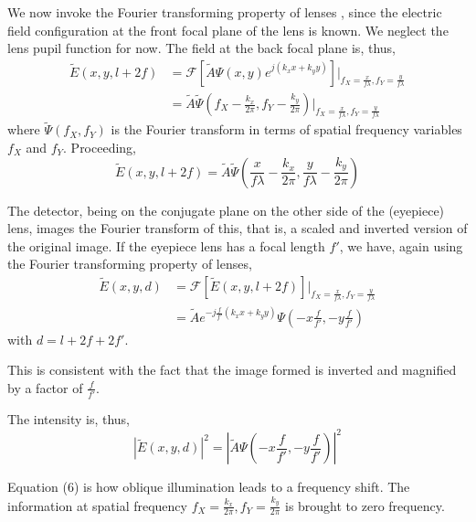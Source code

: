 \documentclass[11pt,a4paper,journal]{IEEEtran}
\begin{document}
We now invoke the Fourier transforming property of lenses \cite[p.~104]{Goodman}, since the electric field configuration at the front focal plane of the lens is known. We neglect the lens pupil function for now. The field at the back focal plane is, thus, 
\begin{equation}
\begin{split}
\tilde{E}(x, y, l+2f) &= \mathcal{F}[\tilde{A} \Psi (x, y) e^{j(k_x x + k_y y)}] \bigg|_{f_X=\frac{x}{f\lambda}, f_Y=\frac{y}{f\lambda}} \\
					  &= \tilde{A} \tilde{\Psi}\left(f_X - \frac{k_x}{2\pi}, f_Y - \frac{k_y}{2\pi}\right) \bigg|_{f_X=\frac{x}{f\lambda}, f_Y=\frac{y}{f\lambda}}
\end{split}
\end{equation}
where $\tilde{\Psi}(f_X, f_Y)$ is the Fourier transform in terms of spatial frequency variables $f_X$ and $f_Y$. Proceeding, 
\begin{equation}
\tilde{E}(x, y, l+2f) = \tilde{A} \tilde{\Psi}\left(\frac{x}{f\lambda} - \frac{k_x}{2\pi}, \frac{y}{f\lambda} - \frac{k_y}{2\pi}\right)
\end{equation}

The detector, being on the conjugate plane on the other side of the (eyepiece) lens, images the Fourier transform of this, that is, a scaled and inverted version of the original image. If the eyepiece lens has a focal length $f'$, we have, again using the Fourier transforming property of lenses,
\begin{equation}
\begin{split}
\tilde{E}(x, y, d) &= \mathcal{F}[\tilde{E}(x, y, l+2f)] \bigg|_{f_X=\frac{x}{f\lambda}, f_Y=\frac{y}{f\lambda}} \\
&= \tilde{A} e^{-j\frac{f}{f'}\left(k_x x + k_y y\right)} \Psi\left(-x\frac{f}{f'}, -y\frac{f}{f'}\right)
\end{split}
\end{equation}
with $d=l+2f+2f'$.

This is consistent with the fact that the image formed is inverted and magnified by a factor of $\frac{f}{f'}$.

The intensity is, thus,
\begin{equation}
|\tilde{E}(x, y, d)|^2 = \left|\tilde{A} \Psi\left(-x\frac{f}{f'}, -y\frac{f}{f'}\right)\right|^2
\end{equation}

Equation (6) is how oblique illumination leads to a frequency shift. The information at spatial frequency $f_X = \frac{k_x}{2\pi}, f_Y = \frac{k_y}{2\pi}$ is brought to zero frequency.
\end{document}
